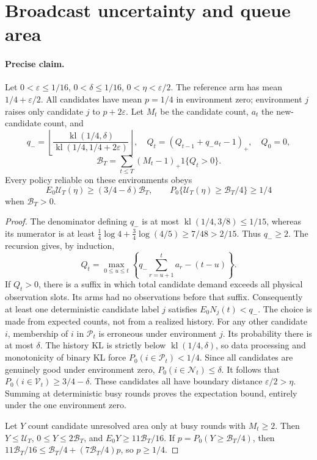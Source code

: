 \documentclass[11pt]{article}
\theoremstyle{remark}
\begin{document}
\section{Broadcast uncertainty and queue area}
\label{app:broadcast}

\paragraph{Precise claim.}
Let $0<\varepsilon\le1/16$, $0<\delta\le1/16$,
$0<\eta<\varepsilon/2$. The reference arm has mean
$1/4+\varepsilon/2$. All candidates have mean $p=1/4$ in environment zero;
environment $j$ raises only candidate $j$ to $p+2\varepsilon$. Let $M_t$ be
the candidate count, $a_t$ the new-candidate count, and
\[
 q_- =\left\lfloor\frac{\operatorname{kl}(1/4,\delta)}
                         {\operatorname{kl}(1/4,1/4+2\varepsilon)}\right\rfloor,
 \quad Q_t=(Q_{t-1}+q_-a_t-1)_+,\quad Q_0=0,
\]
\[
 \mathcal B_T=\sum_{t\le T}(M_t-1)_+1\{Q_t>0\}.
\]
Every policy reliable on these environments obeys
\[
 E_0\mathcal U_T(\eta)\ge(3/4-\delta)\mathcal B_T,
 \qquad
 P_0\{\mathcal U_T(\eta)\ge\mathcal B_T/4\}\ge1/4
\]
when $\mathcal B_T>0$.

\begin{proof}
The denominator defining $q_-$ is at most
$\operatorname{kl}(1/4,3/8)\le1/15$, whereas its numerator is at least
$\frac14\log4+\frac34\log(4/5)\ge7/48>2/15$. Thus $q_-\ge2$.
The recursion gives, by induction,
\[
 Q_t=\max_{0\le u\le t}\left\{
       q_-\sum_{r=u+1}^ta_r-(t-u)\right\}.
\]
If $Q_t>0$, there is a suffix in which total candidate demand exceeds all
physical observation slots. Its arms had no observations before that suffix.
Consequently at least one deterministic candidate label $j$ satisfies
$E_0N_j(t)<q_-$. The choice is made from expected counts, not from a realized
history. For any other candidate $i$, membership of $i$ in $\mathcal P_t$ is erroneous
under environment $j$. Its probability there is at most $\delta$.
The history KL is strictly below $\operatorname{kl}(1/4,\delta)$, so data
processing and monotonicity of binary KL force $P_0(i\in \mathcal P_t)<1/4$.
Since all candidates are genuinely good under environment zero,
$P_0(i\in \mathcal N_t)\le\delta$. It follows that
$P_0(i\in \mathcal V_t)\ge3/4-\delta$. These candidates all have boundary distance
$\varepsilon/2>\eta$. Summing at deterministic busy rounds proves the
expectation bound, entirely under the one environment zero.

Let $Y$ count candidate unresolved area only at busy rounds with $M_t\ge2$.
Then $Y\le\mathcal U_T$, $0\le Y\le2\mathcal B_T$, and
$E_0Y\ge11\mathcal B_T/16$. If
$p=P_0(Y\ge\mathcal B_T/4)$, then
$11\mathcal B_T/16\le\mathcal B_T/4+(7\mathcal B_T/4)p$, so $p\ge1/4$.
\end{proof}
\end{document}
